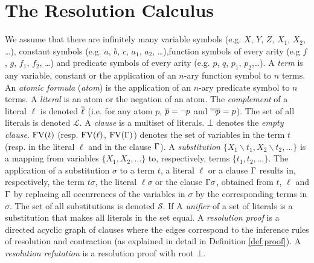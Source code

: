 \documentclass{llncs}
\begin{document}
\section{The Resolution Calculus}

We assume that there are infinitely many variable symbols (e.g. $X$, $Y$, $Z$, $X_1$, $X_2$, \ldots), constant symbols (e.g. $a$, $b$, $c$, $a_1$, $a_2$, \ldots),function symbols of every arity (e.g $f$, $g$, $f_1$, $f_2$, \ldots) and predicate symbols of every arity (e.g. $p$, $q$, $p_1$, $p_2$,\ldots). A \emph{term} is any variable, constant or the application of an $n$-ary function symbol to $n$ terms.
An \emph{atomic formula} (\emph{atom}) is the application of an $n$-ary predicate symbol to $n$ terms. A \emph{literal} is an atom or the negation of an atom. The
\emph{complement} of a literal $\ell$ is denoted $\overline{\ell}$ (i.e. for any atom $p$,
$\overline{p} = \neg p$ and $\overline{\neg p} = p$). The set of all literals is denoted $\mathcal{L}$. A
\emph{clause} is a multiset of literals. $\bot$ denotes the \emph{empty clause}.
$\mathrm{FV}(t)$ (resp. $\mathrm{FV}(\ell)$, $\mathrm{FV}(\Gamma)$) denotes the set of variables in the term $t$ (resp. in the literal $\ell$ and in the clause $\Gamma$).
A \emph{substitution} $\{ X_1\backslash t_1, X_2 \backslash t_2, \ldots \}$ is a mapping from variables $\{ X_1, X_2, \ldots \}$ to, respectively, terms $\{t_1, t_2, \ldots \}$. The application of a substitution $\sigma$ to a term $t$, a literal $\ell$ or a clause $\Gamma$ results in, respectively, the term $t \sigma$, the literal $\ell \sigma$ or the clause $\Gamma \sigma$, obtained from $t$, $\ell$ and $\Gamma$ by replacing all occurrences of the variables in $\sigma$ by the corresponding terms in $\sigma$. The set of all substitutions is denoted $\mathcal{S}$. If  A \emph{unifier} of a set of literals is a substitution that makes all literals in the set equal.
A \emph{resolution proof} is a directed acyclic graph of clauses where the edges correspond to the inference rules of resolution and contraction (as explained in detail in Definition \ref{def:proof}). A \emph{resolution refutation} is a resolution proof with root $\bot$.


\newcommand{\axiom}[1]{\widehat{#1}}
\newcommand{\n}{v}
\newcommand{\raiz}[1]{\rho(#1)}

\newcommand{\con}[3]{\lfloor #1 \rfloor_{#2}^{#3}}
\end{document}
